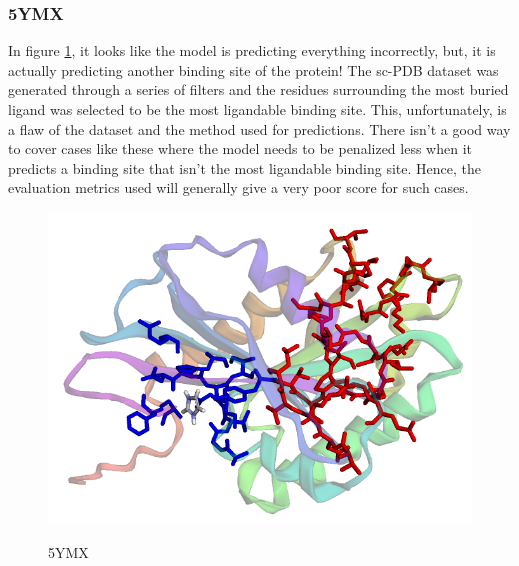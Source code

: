 \documentclass[journal=jacsat,manuscript=article]{achemso}
\begin{document}
\subsubsection{5YMX}
\quad In figure \ref{fig:5ymx}, it looks like the model is predicting everything incorrectly, but, it is actually predicting another binding site of the protein! The sc-PDB dataset was generated through a series of filters and the residues surrounding the most buried ligand was selected to be the most ligandable binding site. This, unfortunately, is a flaw of the dataset and the method used for predictions. There isn't a good way to cover cases like these where the model needs to be penalized less when it predicts a binding site that isn't the most ligandable binding site. Hence, the evaluation metrics used will generally give a very poor score for such cases.
\begin{figure}
    \caption{\centering 5YMX}
    \centering
    \noindent\includegraphics[scale=0.45]{5ymx.png}
    \label{fig:5ymx}
\end{figure}
\end{document}
